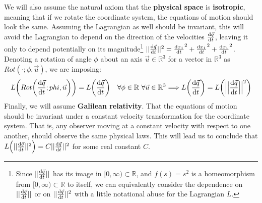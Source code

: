 \documentclass[11pt, a4paper]{article} %
\newcommand{\R}{\mathbb{R}} %
\begin{document}
We will also assume the natural axiom that the {\bf physical space} is {\bf isotropic}, meaning that if we rotate the coordinate system, the equations of motion should look the same. Assuming the Lagrangian as well should be invariant, this will avoid the Lagrangian to depend on the direction of the velocities $\dv{\vec{q}}{t}$, leaving it only to depend potentially on its magnitude\footnote{Since $||\dv{\vec{q}}{t}||$ has its image in $[0,\infty)\subset\R$, and $f(s)=s^2$ is a homeomorphism from $[0,\infty)\subset\R$ to itself, we can equivalently consider the dependence on $||\dv{\vec{q}}{t}||$ or on $||\dv{\vec{q}}{t}||^2$ with a little notational abuse for the Lagrangian $L$.} $||\dv{\vec{q}}{t}||^2=\dv{x_1}{t}^2+\dv{x_1}{t}^2+\dv{x_1}{t}^2$. Denoting a rotation of angle $\phi$ about an axis $\vec{u}\in\R^3$ for a vector in $\R^3$ as $Rot(\cdot;\phi, \vec{u})$, we are imposing:
\begin{equation}
L\qty( Rot\qty( \dv{\vec{q}}{t}; phi, \vec{u} ))=L\qty( \dv{\vec{q}}{t})\quad \forall \phi\in\R\ \forall \vec{u}\in \R^3 \Longrightarrow L\qty(\dv{\vec{q}}{t})=L\qty( \Big|\Big|\dv{\vec{q}}{t}\Big|\Big|^2)
\end{equation}
Finally, we will assume {\bf Galilean relativity}. That the equations of motion should be invariant under a constant velocity transformation for the coordinate system. That is, any observer moving at a constant velocity with respect to one another, should observe the same physical laws. This will lead us to conclude that $L\qty( ||\dv{\vec{q}}{t}||^2)=C ||\dv{\vec{q}}{t}||^2$ for some real constant $C$.
\end{document}
